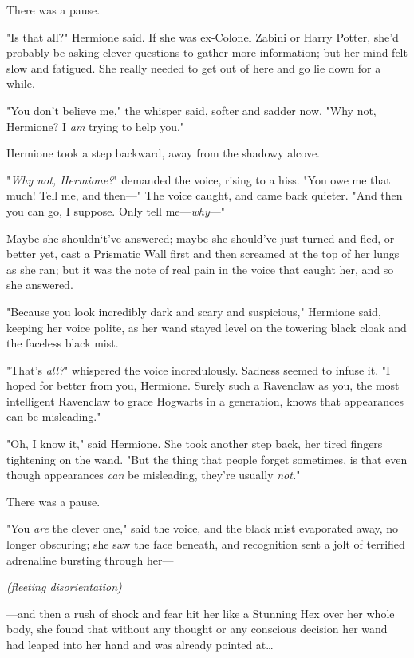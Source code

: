 There was a pause.

"Is that all?" Hermione said. If she was ex-Colonel Zabini or Harry Potter, 
she'd probably be asking clever questions to gather more information; but her 
mind felt slow and fatigued. She really needed to get out of here and go lie 
down for a while.

"You don't believe me," the whisper said, softer and sadder now. "Why not, 
Hermione? I \emph{am} trying to help you."

Hermione took a step backward, away from the shadowy alcove.

"\emph{Why not, Hermione?}" demanded the voice, rising to a hiss. "You owe me 
that much! Tell me, and then---" The voice caught, and came back quieter. "And 
then you can go, I suppose. Only tell me---\emph{why}---"

Maybe she shouldn`t've answered; maybe she should've just turned and fled, or 
better yet, cast a Prismatic Wall first and then screamed at the top of her 
lungs as she ran; but it was the note of real pain in the voice that caught 
her, and so she answered.

"Because you look incredibly dark and scary and suspicious," Hermione said, 
keeping her voice polite, as her wand stayed level on the towering black cloak 
and the faceless black mist.

"That's \emph{all?}" whispered the voice incredulously. Sadness seemed to 
infuse it. "I hoped for better from you, Hermione. Surely such a Ravenclaw as 
you, the most intelligent Ravenclaw to grace Hogwarts in a generation, knows 
that appearances can be misleading."

"Oh, I know it," said Hermione. She took another step back, her tired fingers 
tightening on the wand. "But the thing that people forget sometimes, is that 
even though appearances \emph{can} be misleading, they're usually \emph{not.}"

There was a pause.

"You \emph{are} the clever one," said the voice, and the black mist evaporated 
away, no longer obscuring; she saw the face beneath, and recognition sent a 
jolt of terrified adrenaline bursting through her---

\emph{(fleeting disorientation)}

---and then a rush of shock and fear hit her like a Stunning Hex over her whole 
body, she found that without any thought or any conscious decision her wand had 
leaped into her hand and was already pointed at{\ldots}

